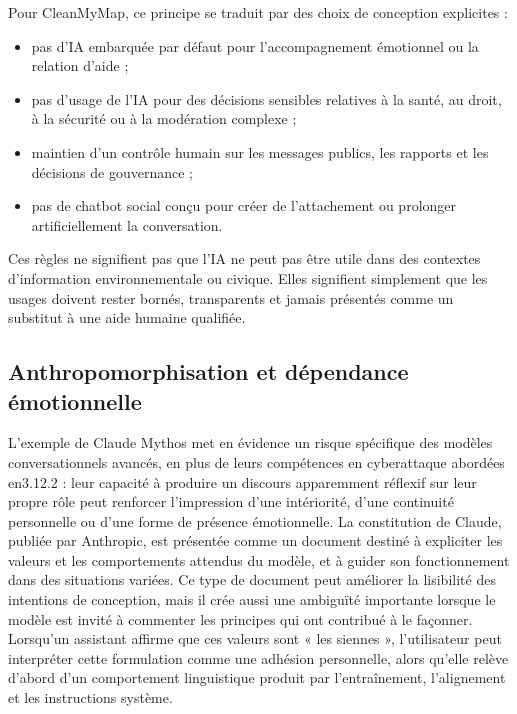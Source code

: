 \documentclass[
  10pt,
  a4paper,
  DIV=11,
  numbers=noendperiod,
  oneside]{scrreprt}
\providecommand{\tightlist}{%
  \setlength{\itemsep}{0pt}\setlength{\parskip}{0pt}}
\begin{document}
Pour CleanMyMap, ce principe se traduit par des choix de conception
explicites :

\begin{itemize}
\tightlist
\item
  pas d'IA embarquée par défaut pour l'accompagnement émotionnel ou la
  relation d'aide ;
\item
  pas d'usage de l'IA pour des décisions sensibles relatives à la santé,
  au droit, à la sécurité ou à la modération complexe ;
\item
  maintien d'un contrôle humain sur les messages publics, les rapports
  et les décisions de gouvernance ;
\item
  pas de chatbot social conçu pour créer de l'attachement ou prolonger
  artificiellement la conversation.
\end{itemize}

Ces règles ne signifient pas que l'IA ne peut pas être utile dans des
contextes d'information environnementale ou civique. Elles signifient
simplement que les usages doivent rester bornés, transparents et jamais
présentés comme un substitut à une aide humaine qualifiée.

\subsection{Anthropomorphisation et dépendance
émotionnelle}\label{anthropomorphisation-et-duxe9pendance-uxe9motionnelle}

L'exemple de Claude Mythos met en évidence un risque spécifique des
modèles conversationnels avancés, en plus de leurs compétences en
cyberattaque abordées en3.12.2 : leur capacité à produire un discours
apparemment réflexif sur leur propre rôle peut renforcer l'impression
d'une intériorité, d'une continuité personnelle ou d'une forme de
présence émotionnelle. La constitution de Claude, publiée par Anthropic,
est présentée comme un document destiné à expliciter les valeurs et les
comportements attendus du modèle, et à guider son fonctionnement dans
des situations variées. Ce type de document peut améliorer la lisibilité
des intentions de conception, mais il crée aussi une ambiguïté
importante lorsque le modèle est invité à commenter les principes qui
ont contribué à le façonner. Lorsqu'un assistant affirme que ces valeurs
sont « les siennes », l'utilisateur peut interpréter cette formulation
comme une adhésion personnelle, alors qu'elle relève d'abord d'un
comportement linguistique produit par l'entraînement, l'alignement et
les instructions système.
\end{document}
